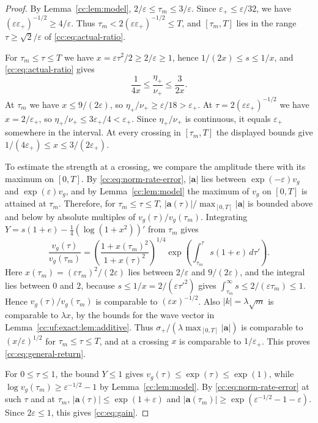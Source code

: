 \begin{proof}
By Lemma~\ref{cc:lem:model}, $2/\varepsilon\le\tau_m\le3/\varepsilon$.
Since $\varepsilon_+\le\varepsilon/32$, we have
$(\varepsilon\varepsilon_+)^{-1/2}\ge4/\varepsilon$. Thus
$\tau_m<2(\varepsilon\varepsilon_+)^{-1/2}\le T$, and $[\tau_m,T]$ lies
in the range $\tau\ge\sqrt2/\varepsilon$ of \eqref{cc:eq:actual-ratio}.

For $\tau_m\le\tau\le T$ we have
$x=\varepsilon\tau^2/2\ge2/\varepsilon\ge1$, hence
$1/(2x)\le s\le1/x$, and \eqref{cc:eq:actual-ratio} gives
\[
 \frac1{4x}\le\frac{\eta_+}{\nu_+}\le\frac3{2x} .
\]
At $\tau_m$ we have $x\le9/(2\varepsilon)$, so
$\eta_+/\nu_+\ge\varepsilon/18>\varepsilon_+$. At
$\tau=2(\varepsilon\varepsilon_+)^{-1/2}$ we have $x=2/\varepsilon_+$,
so $\eta_+/\nu_+\le3\varepsilon_+/4<\varepsilon_+$.
Since $\eta_+/\nu_+$ is continuous, it equals $\varepsilon_+$ somewhere
in the interval. At every crossing in $[\tau_m,T]$ the displayed bounds
give $1/(4\varepsilon_+)\le x\le3/(2\varepsilon_+)$.

To estimate the strength at a crossing, we compare the amplitude there
with its maximum on $[0,T]$. By \eqref{cc:eq:norm-rate-error},
$|\mathbf a|$ lies between $\exp(-\varepsilon)v_g$ and
$\exp(\varepsilon)v_g$, and by Lemma~\ref{cc:lem:model} the maximum
of $v_g$ on $[0,T]$ is attained at $\tau_m$. Therefore, for
$\tau_m\le\tau\le T$,
$|\mathbf a(\tau)|/\max_{[0,T]}|\mathbf a|$ is bounded above and below by
absolute multiples of $v_g(\tau)/v_g(\tau_m)$. Integrating
$Y=s(1+e)-\frac14(\log(1+x^2))'$ from $\tau_m$ gives
\[
 \frac{v_g(\tau)}{v_g(\tau_m)}
 =\left(\frac{1+x(\tau_m)^2}{1+x(\tau)^2}\right)^{1/4}
       \exp\left(\int_{\tau_m}^{\tau}s(1+e)\,d\tau'\right).
\]
Here $x(\tau_m)=(\varepsilon\tau_m)^2/(2\varepsilon)$ lies between
$2/\varepsilon$ and $9/(2\varepsilon)$, and the integral lies between
$0$ and $2$, because $s\le1/x=2/(\varepsilon\tau'^2)$ gives
$\int_{\tau_m}^\infty s\le2/(\varepsilon\tau_m)\le1$. Hence
$v_g(\tau)/v_g(\tau_m)$ is comparable to $(\varepsilon x)^{-1/2}$. Also
$|k|=\lambda\sqrt m$ is comparable to $\lambda x$, by the bounds for
the wave vector in Lemma~\ref{cc:uf:exact:lem:additive}. Thus
$\sigma_+/(\lambda\max_{[0,T]}|\mathbf a|)$ is
comparable to $(x/\varepsilon)^{1/2}$ for $\tau_m\le\tau\le T$, and at a
crossing $x$ is comparable to $1/\varepsilon_+$. This proves
\eqref{cc:eq:general-return}.

For $0\le\tau\le1$, the bound $Y\le1$ gives
$v_g(\tau)\le\exp(\tau)\le\exp(1)$, while
$\log v_g(\tau_m)\ge\varepsilon^{-1/2}-1$ by Lemma~\ref{cc:lem:model}. By
\eqref{cc:eq:norm-rate-error} at such $\tau$ and at $\tau_m$,
$|\mathbf a(\tau)|\le\exp(1+\varepsilon)$ and
$|\mathbf a(\tau_m)|\ge\exp(\varepsilon^{-1/2}-1-\varepsilon)$.
Since $2\varepsilon\le1$, this gives \eqref{cc:eq:gain}.
\end{proof}
